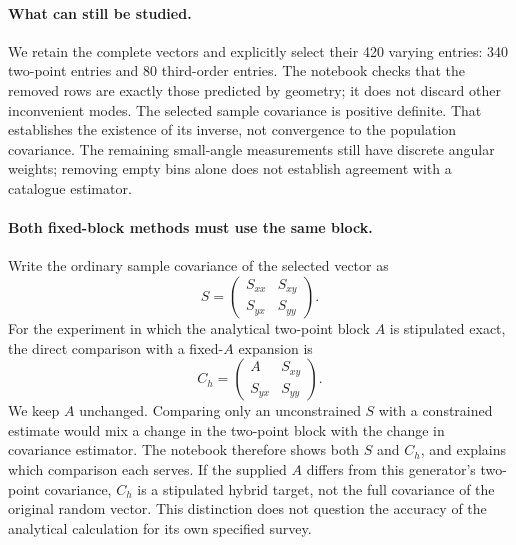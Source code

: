 \documentclass[11pt]{article}
\begin{document}
\paragraph{What can still be studied.}
We retain the complete vectors and explicitly select their 420 varying
entries: 340 two-point entries and 80 third-order entries. The notebook
checks that the removed rows are exactly those predicted by geometry;
it does not discard other inconvenient modes. The selected sample
covariance is positive definite. That establishes the existence of its
inverse, not convergence to the population covariance. The remaining
small-angle measurements still have discrete angular weights; removing
empty bins alone does not establish agreement with a catalogue estimator.

\paragraph{Both fixed-block methods must use the same block.}
Write the ordinary sample covariance of the selected vector as
\begin{equation}
 S=\begin{pmatrix}S_{xx}&S_{xy}\\S_{yx}&S_{yy}\end{pmatrix}.
\end{equation}
For the experiment in which the analytical two-point block $A$ is
stipulated exact, the direct comparison with a fixed-$A$ expansion is
\begin{equation}
 C_h=\begin{pmatrix}A&S_{xy}\\S_{yx}&S_{yy}\end{pmatrix}.
\end{equation}
We keep $A$ unchanged. Comparing only an unconstrained $S$ with a
constrained estimate would mix a change in the two-point block with the
change in covariance estimator. The notebook therefore shows both $S$
and $C_h$, and explains which comparison each serves. If the supplied
$A$ differs from this generator's two-point covariance, $C_h$ is a
stipulated hybrid target, not the full covariance of the original random
vector. This distinction does not question the accuracy of the analytical
calculation for its own specified survey.
\end{document}
